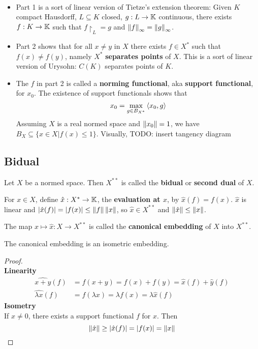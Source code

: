 \documentclass{article}
\begin{document}
\begin{rmks}~
  \begin{itemize}
    \item Part 1 is a sort of linear version of Tietze's extension theorem: Given $K$ compact Hausdorff, $L \subseteq K$ closed, $g : L \to \mathbb K$ continuous, there exists $f : K \to \mathbb K$ such that $f\restriction_L = g$ and $\left\lVert f\right\rVert_\infty = \left\lVert g\right\rVert_\infty$.
    \item Part 2 shows that for all $x \ne y$ in $X$ there exists $f \in X^*$ such that $f(x) \ne f(y)$, namely $X^*$ {\bf separates points} of $X$. This is a sort of linear version of Urysohn: $C(K)$ separates points of $K$.
    \item The $f$ in part 2 is called a {\bf norming functional}, aka {\bf support functional}, for $x_0$. The existence of support functionals shows that
      $$x_0 = \max_{g \in B_{X^*}} \left\langle x_0, g\right\rangle$$
      Assuming $X$ is a real normed space and $\left\lVert x_0\right\rVert = 1$, we have $B_X \subseteq \{x \in X| f(x) \le 1\}$. Visually, TODO: insert tangency diagram
  \end{itemize}
\end{rmks}

\subsection{Bidual}

Let $X$ be a normed space. Then $X^{**}$ is called the {\bf bidual} or {\bf second dual} of $X$.

For $x \in X$, define $\hat x : X^* \to \mathbb K$, the {\bf evaluation at $x$}, by $\hat x(f) = f(x)$. $\hat x$ is linear and $|\hat x(f)| = |f(x)| \le \left\lVert f\right\rVert \left\lVert x\right\rVert$, so $\hat x \in X^{**}$ and $\left\lVert \hat x\right\rVert \le \left\lVert x\right\rVert$.

The map $x \mapsto \hat x : X \to X^{**}$ is called the {\bf canonical embedding} of $X$ into $X^{**}$.

\begin{thm}\label{thm:can-emb}
  The canonical embedding is an isometric embedding.
\end{thm}
\begin{proof}~\\
  {\bf Linearity}
  \begin{align*}
    \widehat{x + y}(f) & = f(x + y) = f(x) + f(y) = \hat x(f) + \hat y(f) \\
    \widehat{\lambda x}(f) & = f(\lambda x) = \lambda f(x) = \lambda \hat x(f)
  \end{align*}
  {\bf Isometry} \\
  If $x \ne 0$, there exists a support functional $f$ for $x$. Then
  $$ \left\lVert \hat x\right\rVert \ge |\hat x(f)| = |f(x)| = \left\lVert x\right\rVert$$
\end{proof}
\end{document}
